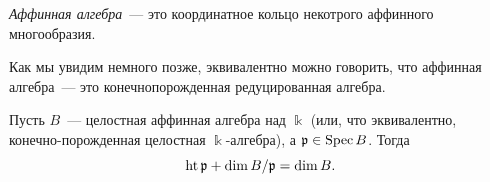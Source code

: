 
	\begin{definition} 
		\emph{Аффинная алгебра}~--- это координатное кольцо некотрого аффинного многообразия. 
	\end{definition}

	\begin{remark}
		Как мы увидим немного позже, эквивалентно можно говорить, что аффинная алгебра~--- это конечнопорожденная редуцированная алгебра. 
	\end{remark}

	\begin{theorem}\label{ht(p) + dim(B/p)} \hypertarget{bilet_15}{}
		Пусть $B$~--- целостная аффинная алгебра над $\Bbbk$ (или, что эквивалентно, конечно-порожденная целостная $\Bbbk$-алгебра), а $\mathfrak{p} \in \operatorname{Spec}{B}$. Тогда 
		\[
			\operatorname{ht}{\mathfrak{p}} + \dim{B/\mathfrak{p}} = \dim{B}.
		\]
	\end{theorem}
